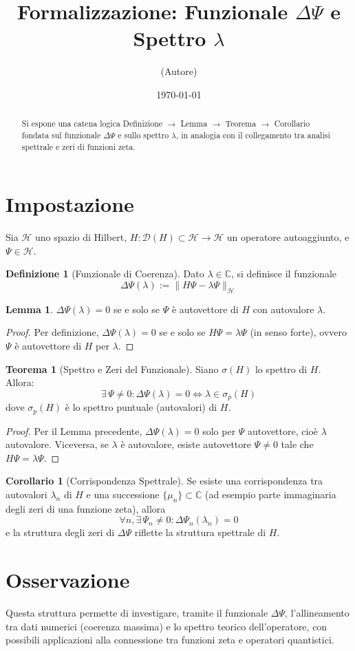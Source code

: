 \documentclass[12pt]{article}
\title{Formalizzazione: Funzionale $\Delta\Psi$ e Spettro $\lambda$}
\author{(Autore)}
\date{\today}
\theoremstyle{definition}
\newtheorem{definition}{Definizione}[section]
\newtheorem{lemma}{Lemma}[section]
\newtheorem{theorem}{Teorema}[section]
\newtheorem{corollary}{Corollario}[section]
\begin{document}
\maketitle

\begin{abstract}
Si espone una catena logica Definizione $\rightarrow$ Lemma $\rightarrow$ Teorema $\rightarrow$ Corollario fondata sul funzionale $\Delta\Psi$ e sullo spettro $\lambda$, in analogia con il collegamento tra analisi spettrale e zeri di funzioni zeta.
\end{abstract}

\section{Impostazione}

Sia $\mathcal{H}$ uno spazio di Hilbert, $H: \mathcal{D}(H)\subset\mathcal{H} \to \mathcal{H}$ un operatore autoaggiunto, e $\Psi \in \mathcal{H}$.

\begin{definition}[Funzionale di Coerenza]
Dato $\lambda \in \mathbb{C}$, si definisce il funzionale
\[
\Delta\Psi(\lambda) := \| H\Psi - \lambda\Psi \|_{\mathcal{H}}
\]
\end{definition}

\begin{lemma}
$\Delta\Psi(\lambda) = 0$ se e solo se $\Psi$ è autovettore di $H$ con autovalore $\lambda$.
\end{lemma}

\begin{proof}
Per definizione, $\Delta\Psi(\lambda) = 0$ se e solo se $H\Psi = \lambda\Psi$ (in senso forte), ovvero $\Psi$ è autovettore di $H$ per $\lambda$.
\end{proof}

\begin{theorem}[Spettro e Zeri del Funzionale]
Siano $\sigma(H)$ lo spettro di $H$. Allora:
\[
\exists\, \Psi \neq 0 : \Delta\Psi(\lambda) = 0 \iff \lambda \in \sigma_p(H)
\]
dove $\sigma_p(H)$ è lo spettro puntuale (autovalori) di $H$.
\end{theorem}

\begin{proof}
Per il Lemma precedente, $\Delta\Psi(\lambda) = 0$ solo per $\Psi$ autovettore, cioè $\lambda$ autovalore. Viceversa, se $\lambda$ è autovalore, esiste autovettore $\Psi \neq 0$ tale che $H\Psi = \lambda\Psi$.
\end{proof}

\begin{corollary}[Corrispondenza Spettrale]
Se esiste una corrispondenza tra autovalori $\lambda_n$ di $H$ e una successione $\{\mu_n\} \subset \mathbb{C}$ (ad esempio parte immaginaria degli zeri di una funzione zeta), allora
\[
\forall n, \exists\, \Psi_n \neq 0 : \Delta\Psi_n(\lambda_n) = 0
\]
e la struttura degli zeri di $\Delta\Psi$ riflette la struttura spettrale di $H$.
\end{corollary}

\section{Osservazione}

Questa struttura permette di investigare, tramite il funzionale $\Delta\Psi$, l’allineamento tra dati numerici (coerenza massima) e lo spettro teorico dell’operatore, con possibili applicazioni alla connessione tra funzioni zeta e operatori quantistici.
\end{document}
